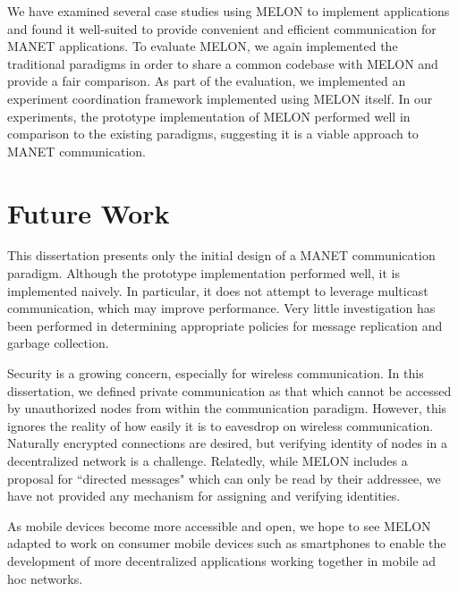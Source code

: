 We have examined several case studies using MELON to implement applications and found it well-suited to provide convenient and efficient communication for MANET applications. To evaluate MELON, we again implemented the traditional paradigms in order to share a common codebase with MELON and provide a fair comparison. As part of the evaluation, we implemented an experiment coordination framework implemented using MELON itself. In our experiments, the prototype implementation of MELON performed well in comparison to the existing paradigms, suggesting it is a viable approach to MANET communication.

\section{Future Work}

This dissertation presents only the initial design of a MANET communication paradigm. Although the prototype implementation performed well, it is implemented naively. In particular, it does not attempt to leverage multicast communication, which may improve performance. Very little investigation has been performed in determining appropriate policies for message replication and garbage collection.

Security is a growing concern, especially for wireless communication. In this dissertation, we defined private communication as that which cannot be accessed by unauthorized nodes from within the communication paradigm. However, this ignores the reality of how easily it is to eavesdrop on wireless communication. Naturally encrypted connections are desired, but verifying identity of nodes in a decentralized network is a challenge. Relatedly, while MELON includes a proposal for ``directed messages" which can only be read by their addressee, we have not provided any mechanism for assigning and verifying identities.

As mobile devices become more accessible and open, we hope to see MELON adapted to work on consumer mobile devices such as smartphones to enable the development of more decentralized applications working together in mobile ad hoc networks.